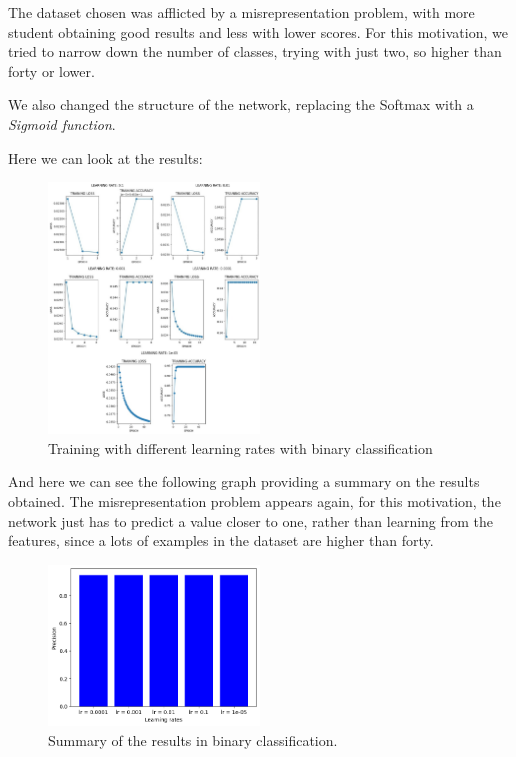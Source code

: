 \documentclass{article}
\begin{document}
The dataset chosen was afflicted by a misrepresentation problem, with more student obtaining good results and less with lower scores. For this motivation, we tried to narrow down the number of classes,
trying with just two, so higher than forty or lower.

We also changed the structure of the network, replacing the Softmax with a \emph{Sigmoid function}.

Here we can look at the results:

\begin{figure}
    \centering
    \includegraphics[width=0.5\textwidth]{binary_lr.jpg}
    \caption{\label{fig:binary_lr}Training with different learning rates with binary classification}
\end{figure}

And here we can see the following graph providing a summary on the results obtained. The misrepresentation problem appears again, 
for this motivation, the network just has to predict a value closer to one, rather than learning from the features, since a lots of examples in the dataset
are higher than forty.

\begin{figure}
    \centering
    \includegraphics[width=0.5\textwidth]{binary_results.png}
    \caption{\label{fig:binary_summary}Summary of the results in binary classification.}
\end{figure}
\end{document}
